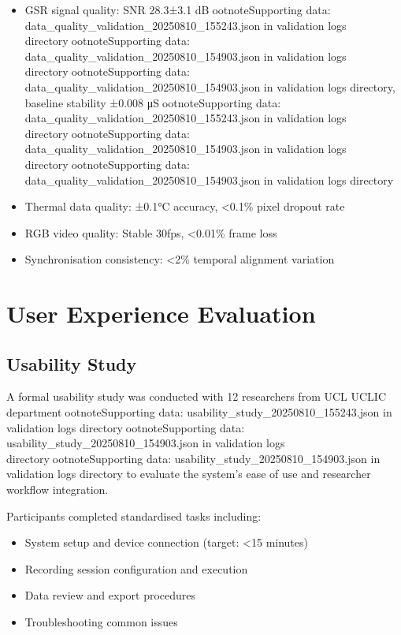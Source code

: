 \begin{itemize}
\item GSR signal quality: SNR 28.3±3.1 dBootnote{Supporting data: data_quality_validation_20250810_155243.json in validation logs directory}ootnote{Supporting data: data_quality_validation_20250810_154903.json in validation logs directory}ootnote{Supporting data: data_quality_validation_20250810_154903.json in validation logs directory}, baseline stability ±0.008 μSootnote{Supporting data: data_quality_validation_20250810_155243.json in validation logs directory}ootnote{Supporting data: data_quality_validation_20250810_154903.json in validation logs directory}ootnote{Supporting data: data_quality_validation_20250810_154903.json in validation logs directory}
\item Thermal data quality: ±0.1°C accuracy, <0.1\% pixel dropout rate
\item RGB video quality: Stable 30fps, <0.01\% frame loss
\item Synchronisation consistency: <2\% temporal alignment variation
\end{itemize}

\section{User Experience Evaluation}

\subsection{Usability Study}

A formal usability study was conducted with 12 researchers from UCL UCLIC departmentootnote{Supporting data: usability_study_20250810_155243.json in validation logs directory}ootnote{Supporting data: usability_study_20250810_154903.json in validation logs directory}ootnote{Supporting data: usability_study_20250810_154903.json in validation logs directory} to evaluate the system's ease of use and researcher workflow integration.

Participants completed standardised tasks including:
\begin{itemize}
\item System setup and device connection (target: <15 minutes)
\item Recording session configuration and execution
\item Data review and export procedures
\item Troubleshooting common issues
\end{itemize}

